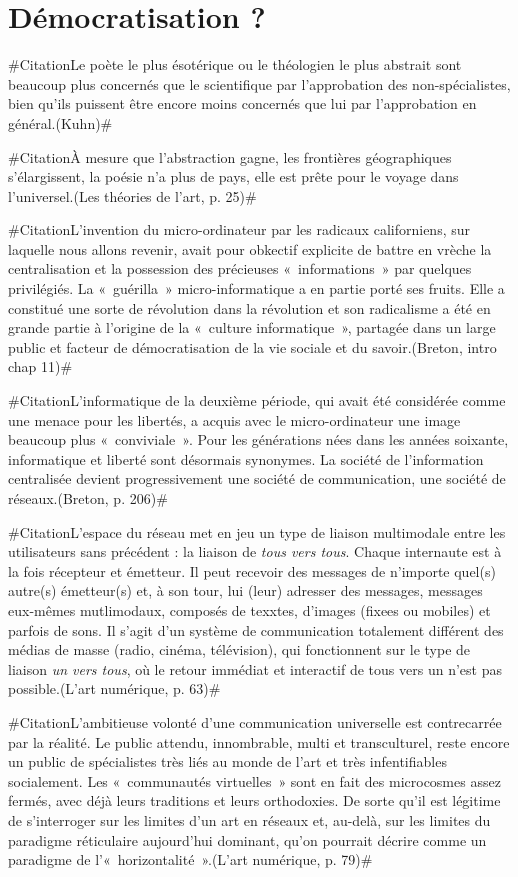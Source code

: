 \documentclass[a4paper,12pt]{article}
\newcommand{\guill}[1]{«~#1~»}
\newcommand{\zitat}[2]{\#Citation#1(#2)\#}
\begin{document}
\section{Démocratisation ?}

\zitat{Le poète le plus ésotérique ou le théologien le plus abstrait sont beaucoup plus concernés que le scientifique par l'approbation des non-spécialistes, bien qu'ils puissent être encore moins concernés que lui par l'approbation en général.}
{Kuhn}

\zitat{À mesure que l'abstraction gagne, les frontières géographiques s'élargissent, la poésie n'a plus de pays, elle est prête pour le voyage dans l'universel.}
{Les théories de l'art, p. 25}

\zitat{L'invention du micro-ordinateur par les radicaux californiens, sur laquelle nous allons revenir, avait pour obkectif explicite de battre en vrèche la centralisation et la possession des précieuses \guill{informations} par quelques privilégiés. La \guill{guérilla} micro-informatique a en partie porté ses fruits. Elle a constitué une sorte de révolution dans la révolution et son radicalisme a été en grande partie à l'origine de la \guill{culture informatique}, partagée dans un large public et facteur de démocratisation de la vie sociale et du savoir.}
{Breton, intro chap 11}

\zitat{L'informatique de la deuxième période, qui avait été considérée comme une menace pour les libertés, a acquis avec le micro-ordinateur une image beaucoup plus \guill{conviviale}. Pour les générations nées dans les années soixante, informatique et liberté sont désormais synonymes. La société de l'information centralisée devient progressivement une société de communication, une société de réseaux.}
{Breton, p. 206}

\zitat{L'espace du réseau met en jeu un type de liaison multimodale entre les utilisateurs sans précédent : la liaison de \emph{tous vers tous}. Chaque internaute est à la fois récepteur et émetteur. Il peut recevoir des messages de n'importe quel(s) autre(s) émetteur(s) et, à son tour, lui (leur) adresser des messages, messages eux-mêmes mutlimodaux, composés de texxtes, d'images (fixees ou mobiles) et parfois de sons. Il s'agit d'un système de communication totalement différent des médias de masse (radio, cinéma, télévision), qui fonctionnent sur le type de liaison \emph{un vers tous}, où le retour immédiat et interactif de tous vers un n'est pas possible.}
{L'art numérique, p. 63}

\zitat{L'ambitieuse volonté d'une communication universelle est contrecarrée par la réalité. Le public attendu, innombrable, multi et transculturel, reste encore un public de spécialistes très liés au monde de l'art et très infentifiables socialement. Les \guill{communautés virtuelles} sont en fait des microcosmes assez fermés, avec déjà leurs traditions et leurs orthodoxies. De sorte qu'il est légitime de s'interroger sur les limites d'un art en réseaux et, au-delà, sur les limites du paradigme réticulaire aujourd'hui dominant, qu'on pourrait décrire comme un paradigme de l'\guill{horizontalité}.}
{L'art numérique, p. 79}
\end{document}
